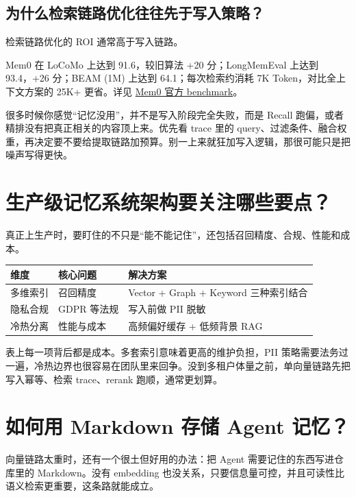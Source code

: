 \documentclass[10pt,a4paper]{ctexart}
\begin{document}
\subsection{为什么检索链路优化往往先于写入策略？}


检索链路优化的 ROI 通常高于写入链路。



Mem0 在 LoCoMo 上达到 91.6，较旧算法 +20 分；LongMemEval 上达到 93.4，+26 分；BEAM (1M) 上达到 64.1；每次检索约消耗 7K Token，对比全上下文方案的 25K+ 更省。详见 \href{https://docs.mem0.ai/core-concepts/memory-evaluation}{Mem0 官方 benchmark}。



很多时候你感觉“记忆没用”，并不是写入阶段完全失败，而是 Recall 跑偏，或者精排没有把真正相关的内容顶上来。优先看 trace 里的 query、过滤条件、融合权重，再决定要不要给提取链路加预算。别一上来就狂加写入逻辑，那很可能只是把噪声写得更快。



\section{生产级记忆系统架构要关注哪些要点？}


真正上生产时，要盯住的不只是“能不能记住”，还包括召回精度、合规、性能和成本。


{\footnotesize
\begin{tabularx}{\textwidth}{|X|X|X|}
\hline
\textbf{维度} & \textbf{核心问题} & \textbf{解决方案} \\
\hline
多维索引 & 召回精度 & Vector + Graph + Keyword 三种索引结合 \\
\hline
隐私合规 & GDPR 等法规 & 写入前做 PII 脱敏 \\
\hline
冷热分离 & 性能与成本 & 高频偏好缓存 + 低频背景 RAG \\
\hline
\end{tabularx}
}



表上每一项背后都是成本。多套索引意味着更高的维护负担，PII 策略需要法务过一遍，冷热边界也很容易在团队里来回争。没到多租户体量之前，单向量链路先把写入幂等、检索 trace、rerank 跑顺，通常更划算。



\section{如何用 Markdown 存储 Agent 记忆？}


向量链路太重时，还有一个很土但好用的办法：把 Agent 需要记住的东西写进仓库里的 Markdown。没有 embedding 也没关系，只要信息量可控，并且可读性比语义检索更重要，这条路就能成立。
\end{document}
